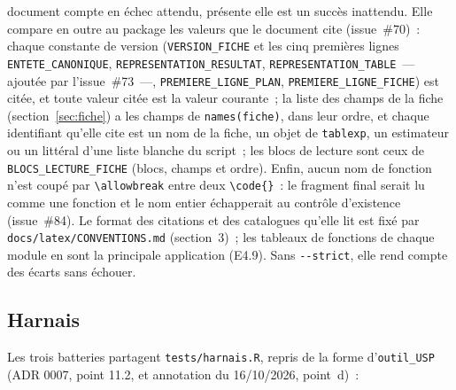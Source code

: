\documentclass[a4paper,11pt]{article}
\newcommand{\code}[1]{\texttt{\small #1}}
\begin{document}
document compte en échec attendu, présente elle est un succès inattendu.
Elle compare en outre au package les valeurs que le document cite
(issue~\#70)~: chaque constante de version (\code{VERSION\_FICHE} et les
cinq premières lignes \code{ENTETE\_CANONIQUE},
\code{REPRESENTATION\_RESULTAT}, \code{REPRESENTATION\_TABLE}~--- ajoutée
par l'issue~\#73~---, \code{PREMIERE\_LIGNE\_PLAN},
\code{PREMIERE\_LIGNE\_FICHE}) est citée, et toute valeur citée est la
valeur courante~; la liste des champs de la fiche
(section~\ref{sec:fiche}) a les champs de \code{names(fiche)}, dans leur
ordre, et chaque identifiant qu'elle cite est un nom de la fiche, un objet
de \code{tablexp}, un estimateur ou un littéral d'une liste blanche du
script~; les blocs de lecture sont ceux de \code{BLOCS\_LECTURE\_FICHE}
(blocs, champs et ordre). Enfin, aucun nom de fonction n'est coupé par
\code{\textbackslash allowbreak} entre deux \code{\textbackslash code\{\}}~: le
fragment final serait lu comme une fonction et le nom entier échapperait au
contrôle d'existence (issue~\#84). Le format des citations et des catalogues qu'elle lit est fixé par
\code{docs/latex/CONVENTIONS.md} (section~3)~; les tableaux de fonctions de
chaque module en sont la principale application (E4.9). Sans \code{-{}-strict}, elle
rend compte des écarts sans échouer.

\subsection{Harnais}
\label{sec:harnais}

Les trois batteries partagent \code{tests/harnais.R}, repris de la forme
d'\code{outil\_USP} (ADR 0007, point 11.2, et annotation du 16/10/2026,
point~d)~:
\end{document}
